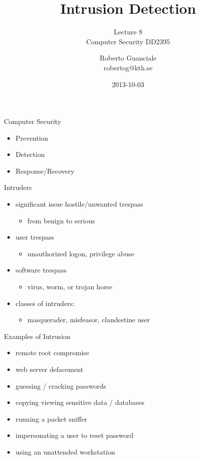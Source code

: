 \documentclass{beamer}
\title{Intrusion Detection}
\subtitle{Lecture 8 \\ Computer Security DD2395}
\author[R. Guanciale]{
  Roberto Guanciale\\
  robertog@kth.se
}
\date{2013-10-03}
\begin{document}
\begin{frame}[plain]
  \titlepage
\end{frame}

\begin{frame}{Computer Security}
  \begin{itemize}
    \item Prevention 
    \item Detection 
    \item Response/Recovery
  \end{itemize}
\end{frame}

\begin{frame}{Intruders}
  \begin{itemize}
  \item significant issue hostile/unwanted trespass 
    \begin{itemize}
    \item from benign to serious 
    \end{itemize}
  \item user trespass 
    \begin{itemize}
    \item unauthorized logon, privilege abuse 
    \end{itemize}
  \item software trespass 
      \begin{itemize}
      \item virus, worm, or trojan horse 
    \end{itemize}
  \item classes of intruders: 
      \begin{itemize}
      \item masquerader, misfeasor, clandestine user
    \end{itemize}
  \end{itemize}
\end{frame}

\begin{frame}{Examples of Intrusion}
  \begin{itemize}
  \item remote root compromise 
  \item web server defacement 
  \item guessing / cracking passwords 
  \item copying viewing sensitive data / databases 
  \item running a packet sniffer 
  \item impersonating a user to reset password 
  \item using an unattended workstation 
  \end{itemize}
\end{frame}
\end{document}
